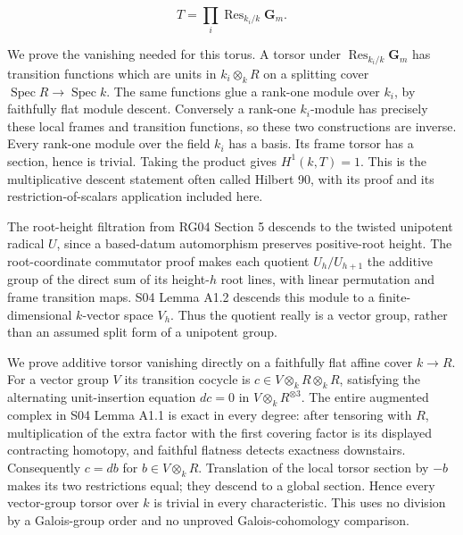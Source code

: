 \documentclass[11pt,a4paper,openany]{report}
\begin{document}
\[
T=\prod_i\operatorname{Res}_{k_i/k}\mathbf G_m.
\]

We prove the vanishing needed for this torus. A torsor under \(\operatorname{Res}_{k_i/k}\mathbf G_m\) has transition functions which are units in \(k_i\otimes_k R\) on a splitting cover \(\operatorname{Spec}R\to\operatorname{Spec}k\). The same functions glue a rank-one module over \(k_i\), by faithfully flat module descent. Conversely a rank-one \(k_i\)-module has precisely these local frames and transition functions, so these two constructions are inverse. Every rank-one module over the field \(k_i\) has a basis. Its frame torsor has a section, hence is trivial. Taking the product gives \(H^1(k,T)=1\). This is the multiplicative descent statement often called Hilbert 90, with its proof and its restriction-of-scalars application included here.

The root-height filtration from RG04 Section 5 descends to the twisted unipotent radical \(U\), since a based-datum automorphism preserves positive-root height. The root-coordinate commutator proof makes each quotient \(U_h/U_{h+1}\) the additive group of the direct sum of its height-\(h\) root lines, with linear permutation and frame transition maps. S04 Lemma A1.2 descends this module to a finite-dimensional \(k\)-vector space \(V_h\). Thus the quotient really is a vector group, rather than an assumed split form of a unipotent group.

We prove additive torsor vanishing directly on a faithfully flat affine cover \(k\to R\). For a vector group \(V\) its transition cocycle is \(c\in V\otimes_k R\otimes_k R\), satisfying the alternating unit-insertion equation \(d c=0\) in \(V\otimes_k R^{\otimes3}\). The entire augmented complex in S04 Lemma A1.1 is exact in every degree: after tensoring with \(R\), multiplication of the extra factor with the first covering factor is its displayed contracting homotopy, and faithful flatness detects exactness downstairs. Consequently \(c=d b\) for \(b\in V\otimes_k R\). Translation of the local torsor section by \(-b\) makes its two restrictions equal; they descend to a global section. Hence every vector-group torsor over \(k\) is trivial in every characteristic. This uses no division by a Galois-group order and no unproved Galois-cohomology comparison.
\end{document}
